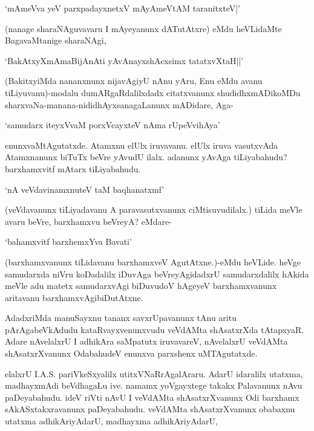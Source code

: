 \begin{shloka}
`mAmeVva yeV parxpadayxnetxV mAyAmeVtAM taranitxteV|'
\end{shloka}

(nanage sharaNAguvavaru I mAyeyanunx dATutAtxre) eMdu heVLidaMte BagavaMtanige sharaNAgi,

\begin{shloka}
`BakAtxyXmAmaBijAnAti yAvAnayxshAcxsimx tatatxvXtaH||'
\end{shloka}

(BakitxyiMda nananxnunx nijavAgiyU nAnu yAru, Enu eMdu avanu tiLiyuvanu)-modalu dumARgaRdalilxdadx citatxvanunx shudidhxmADikoMDu sharxvaNa-manana-nididhAyxsanagaLanunx mADidare, Aga-

\begin{shloka}
`samudarx iteyxVvaM porxVcayxteV nAma rUpeVvihAya'
\end{shloka}

\noindent enunxvaMtAgutatxde. Atamxnu elUlx iruvavanu. elUlx iruva vasutxvAda Atamxnanunx biTuTx beVre yAvudU ilalx. adanunx yAvAga tiLiyabahudu? barxhamxvitf mAtarx tiLiyabahudu.

\begin{shloka}
`nA veVdavinamxnuteV taM baqhanatxmf'
\end{shloka}

(veVdavanunx tiLiyadavanu A paravasutxvanunx ciMtisuvudilalx.) tiLida meVle avaru beVre, barxhamxvu beVreyA? eMdare-

\begin{shloka}
`bahamxvitf barxhemxYva Bavati'
\end{shloka}

(barxhamxvanunx tiLidavanu barxhamxveV AgutAtxne.)-eMdu heVLide. heVge samudarxda niVru koDadalilx iDuvAga beVreyAgidadxrU samudarxdalilx hAkida meVle adu matetx samudarxvAgi biDuvudoV hAgeyeV barxhamxvanunx aritavanu barxhamxvAgibiDutAtxne.

AdadxriMda manuSayxnu tananx savxrUpavanunx tAnu aritu pArAgabeVkAdudu kataRvayxvenunxvudu veVdAMta shAsatxrXda tAtapxyaR. Adare nAvelalxrU I adhikAra saMpatutx iruvavareV, nAvelalxrU veVdAMta shAsatxrXvanunx OdabahudeV enunxva parxshenx uMTAgutatxde.

elalxrU {\eng I.A.S.} pariVkeSxyalilx utitxVNaRrAgalAraru. AdarU idaralilx utatxma, madhayxmAdi beVdhagaLu ive. namamx yoVgayxtege takakx Palavanunx nAvu paDeyabahudu. ideV riVti nAvU I veVdAMta shAsatxrXvanunx Odi barxhamx sAkASxtakxravanunx paDeyabahudu. veVdAMta shAsatxrXvanunx obabaxnu utatxma adhikAriyAdarU, madhayxma adhikAriyAdarU,

